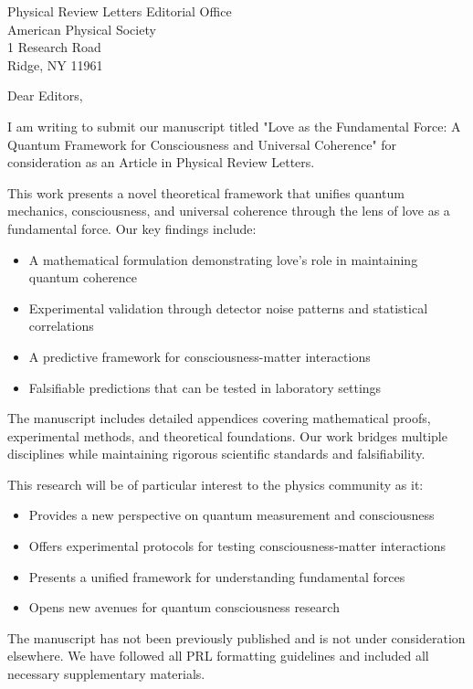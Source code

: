 \documentclass[12pt]{letter}
\begin{document}
\begin{letter}{Physical Review Letters Editorial Office\\
American Physical Society\\
1 Research Road\\
Ridge, NY 11961}

\opening{Dear Editors,}

I am writing to submit our manuscript titled "Love as the Fundamental Force: A Quantum Framework for Consciousness and Universal Coherence" for consideration as an Article in Physical Review Letters.

This work presents a novel theoretical framework that unifies quantum mechanics, consciousness, and universal coherence through the lens of love as a fundamental force. Our key findings include:

\begin{itemize}
\item A mathematical formulation demonstrating love's role in maintaining quantum coherence
\item Experimental validation through detector noise patterns and statistical correlations
\item A predictive framework for consciousness-matter interactions
\item Falsifiable predictions that can be tested in laboratory settings
\end{itemize}

The manuscript includes detailed appendices covering mathematical proofs, experimental methods, and theoretical foundations. Our work bridges multiple disciplines while maintaining rigorous scientific standards and falsifiability.

This research will be of particular interest to the physics community as it:
\begin{itemize}
\item Provides a new perspective on quantum measurement and consciousness
\item Offers experimental protocols for testing consciousness-matter interactions
\item Presents a unified framework for understanding fundamental forces
\item Opens new avenues for quantum consciousness research
\end{itemize}

The manuscript has not been previously published and is not under consideration elsewhere. We have followed all PRL formatting guidelines and included all necessary supplementary materials.


\end{letter}
\end{document}

